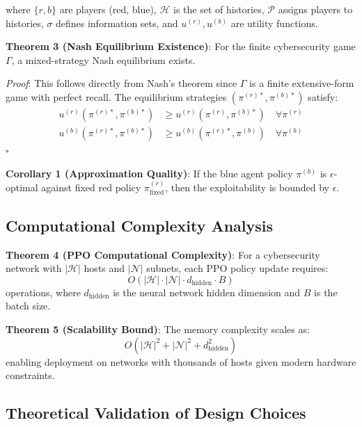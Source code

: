 \documentclass[12pt]{article}
\theoremstyle{definition}
\theoremstyle{plain}
\begin{document}
where $\{r,b\}$ are players (red, blue), $\mathcal{H}$ is the set of histories, $\mathcal{P}$ assigns players to histories, $\sigma$ defines information sets, and $u^{(r)}, u^{(b)}$ are utility functions.

\textbf{Theorem 3 (Nash Equilibrium Existence)}: For the finite cybersecurity game $\Gamma$, a mixed-strategy Nash equilibrium exists.

\textit{Proof}: This follows directly from Nash's theorem since $\Gamma$ is a finite extensive-form game with perfect recall. The equilibrium strategies $(\pi^{(r)*}, \pi^{(b)*})$ satisfy:
\begin{align}
u^{(r)}(\pi^{(r)*}, \pi^{(b)*}) &\geq u^{(r)}(\pi^{(r)}, \pi^{(b)*}) \quad \forall \pi^{(r)} \\
u^{(b)}(\pi^{(r)*}, \pi^{(b)*}) &\geq u^{(b)}(\pi^{(r)*}, \pi^{(b)}) \quad \forall \pi^{(b)}
\end{align}
$\square$

\textbf{Corollary 1 (Approximation Quality)}: If the blue agent policy $\pi^{(b)}$ is $\epsilon$-optimal against fixed red policy $\pi^{(r)}_{\text{fixed}}$, then the exploitability is bounded by $\epsilon$.

\subsection{Computational Complexity Analysis}

\textbf{Theorem 4 (PPO Computational Complexity)}: For a cybersecurity network with $|\mathcal{H}|$ hosts and $|\mathcal{N}|$ subnets, each PPO policy update requires:
\begin{equation}
O(|\mathcal{H}| \cdot |\mathcal{N}| \cdot d_{\text{hidden}} \cdot B)
\end{equation}
operations, where $d_{\text{hidden}}$ is the neural network hidden dimension and $B$ is the batch size.

\textbf{Theorem 5 (Scalability Bound)}: The memory complexity scales as:
\begin{equation}
O(|\mathcal{H}|^2 + |\mathcal{N}|^2 + d_{\text{hidden}}^2)
\end{equation}
enabling deployment on networks with thousands of hosts given modern hardware constraints.

\subsection{Theoretical Validation of Design Choices}
\end{document}
